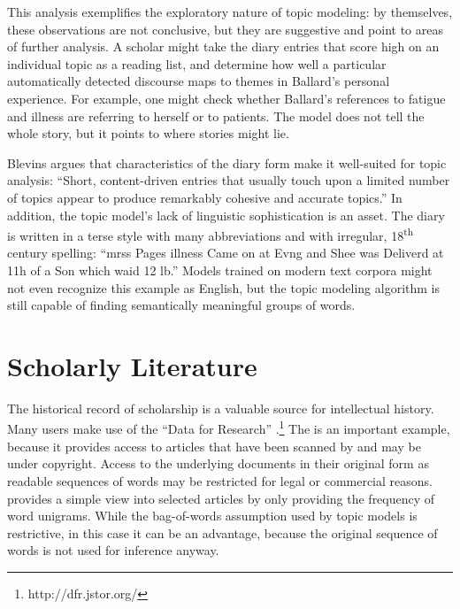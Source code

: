 This analysis exemplifies the exploratory nature of topic modeling: by themselves, these observations are not conclusive, but they are suggestive and point to areas of further analysis.
A scholar might take the diary entries that score high on an individual topic as a reading list, and determine how well a particular automatically detected discourse maps to themes in Ballard's personal experience.
For example, one might check whether Ballard's references to fatigue and illness are referring to herself or to patients.
The model does not tell the whole story, but it points to where stories might lie.

Blevins argues that characteristics of the diary form make it well-suited for topic analysis: ``Short, content-driven entries that usually touch upon a limited number of topics appear to produce remarkably cohesive and accurate topics.''
In addition, the topic model's lack of linguistic sophistication is an asset.
The diary is written in a terse style with many abbreviations and with irregular, 18\textsuperscript{th} century spelling: ``mrss Pages illness Came on at Evng and Shee was Deliverd at 11h of a Son which waid 12 lb.''
Models trained on modern text corpora might not even recognize this example as English, but the topic modeling algorithm is still capable of finding semantically meaningful groups of words.



\section{Scholarly Literature}
\label{sec:scholarly}


The historical record of scholarship is a valuable source for intellectual history.
Many users make use of the  ``Data for Research'' .\footnote{http://dfr.jstor.org/}
The  is an important example, because it provides access to articles that have been scanned by  and may be under copyright.
Access to the underlying documents in their original form as readable sequences of words may be restricted for legal or commercial reasons.
 provides a simple view into selected articles by only providing the frequency of word unigrams.
While the bag-of-words assumption used by topic models is restrictive, in this case it can be an advantage, because the original sequence of words is not used for inference anyway.

